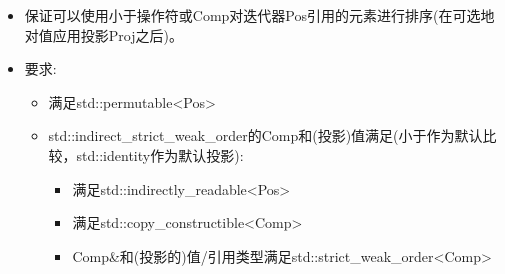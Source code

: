 \begin{itemize}
\item
保证可以使用小于操作符或Comp对迭代器Pos引用的元素进行排序(在可选地对值应用投影Proj之后)。

\item
要求:
\begin{itemize}
\item
满足std::permutable<Pos>

\item
std::indirect\_strict\_weak\_order的Comp和(投影)值满足(小于作为默认比较，std::identity作为默认投影):

\begin{itemize}
\item
满足std::indirectly\_readable<Pos>

\item
满足std::copy\_constructible<Comp>

\item
Comp\&和(投影的)值/引用类型满足std::strict\_weak\_order<Comp>
\end{itemize}
\end{itemize}
\end{itemize}

























